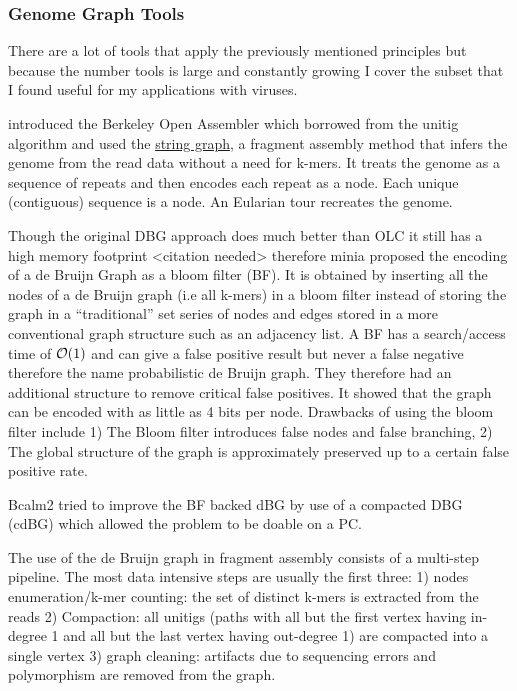 \documentclass[10pt, a4paper]{article}
\begin{document}
\subsubsection{Genome Graph Tools}
\label{sec:org5e6cddd}
There are a lot of tools that apply the previously mentioned principles but
because the number tools is large and constantly growing I cover the subset that
I found useful for my applications with viruses.

\cite{myersFragmentAssemblyString2005} introduced the Berkeley Open Assembler
which borrowed from the unitig algorithm and used the \hyperref[sec:org42d1276]{string graph},
a fragment assembly method that infers the genome from the read data without a
need for k-mers.
It treats the genome as a sequence of repeats and then encodes each repeat as
a node. Each unique (contiguous) sequence is a node. An Eularian tour recreates
the genome.

Though the original DBG approach does much better than OLC it still has a high
memory footprint <citation needed> therefore minia
\cite{chikhiSpaceefficientExactBruijn2013} proposed the encoding of a
de Bruijn Graph as a bloom filter (BF). It is obtained by inserting all the
nodes of a de Bruijn graph (i.e all k-mers) in a bloom filter instead of
storing the graph in a “traditional” set series of nodes and edges stored in a
more conventional graph structure such as an adjacency list.
A BF has a search/access time of  \(\mathcal{O}(1)\) and can give a false positive
result but never a false negative therefore the name probabilistic de Bruijn
graph.
They therefore had an additional structure to remove critical false positives.
It showed that the graph can be encoded with as little as 4 bits per node.
Drawbacks of using the bloom filter include 1) The Bloom filter introduces false
nodes and false branching, 2) The global structure of the graph is approximately
preserved up to a certain false positive rate.

Bcalm2 \cite{chikhiCompactingBruijnGraphs2016} tried to improve the BF backed dBG
by use of a compacted DBG (cdBG) which allowed the problem to be doable on a PC.


The use of the de Bruijn graph in fragment assembly consists of a multi-step
pipeline.
The most data intensive steps are usually the first three: 1) nodes
enumeration/k-mer counting: the set of distinct k-mers is extracted from the
reads 2) Compaction: all unitigs (paths with all but the first vertex having
in-degree 1 and all but the last vertex having out-degree 1) are compacted into
a single vertex 3) graph cleaning: artifacts due to sequencing errors and
polymorphism are removed from the graph.
\end{document}
